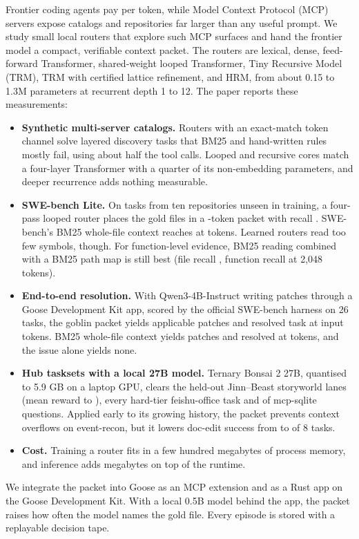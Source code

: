 Frontier coding agents pay per token, while Model Context Protocol (MCP) servers expose catalogs and repositories far
larger than any useful prompt. We study small local routers that explore such MCP surfaces and hand the frontier model
a compact, verifiable context packet. The routers are lexical, dense, feed-forward Transformer, shared-weight looped
Transformer, Tiny Recursive Model (TRM), TRM with certified lattice refinement, and HRM, from about 0.15 to 1.3M
parameters at recurrent depth 1 to 12. The paper reports these measurements:
\begin{itemize}
\item \textbf{Synthetic multi-server catalogs.} Routers with an exact-match token channel solve layered discovery tasks that BM25 and
hand-written rules mostly fail, using about half the tool calls. Looped and recursive cores match a four-layer
Transformer with a quarter of its non-embedding parameters, and deeper recurrence adds nothing measurable.
\item \textbf{SWE-bench Lite.} On \McpThreeInstances{} tasks from ten repositories unseen in training, a four-pass looped
router places the gold files in a \CompactFirstTokens{}-token packet with recall \CompactFirstFileRecall{}. SWE-bench's
BM25 whole-file context reaches \BmFilesRecallTwentySeven{} at \BmFilesTokensTwentySeven{} tokens. Learned routers
read too few symbols, though. For function-level evidence, BM25 reading combined with a BM25 path map is still best
(file recall \BmComposedFileRecallTwoK{}, function recall \BmComposedSymRecallTwoK{} at 2,048 tokens).
\item \textbf{End-to-end resolution.} With Qwen3-4B-Instruct writing patches through a Goose Development Kit app, scored by the
official SWE-bench harness on 26 tasks, the goblin packet yields \EtoeGoblinPatches{} applicable patches and
\EtoeGoblinResolved{} resolved task at \EtoeGoblinInput{} input tokens. BM25 whole-file context yields
\EtoeBmPatches{} patches and \EtoeBmResolved{} resolved at \EtoeBmInput{} tokens, and the issue alone yields none.
\item \textbf{Hub tasksets with a local 27B model.} Ternary Bonsai 2 27B, quantised to 5.9 GB on a laptop GPU, clears
the held-out Jinn--Beast storyworld lanes (mean reward \HubJbmCrossDevEightZeroMean{} to \HubJbmMeshTwoDevMean{}), every
hard-tier feishu-office task and \HubSqliteAllSolved{} of \HubSqliteAllN{} mcp-sqlite questions. Applied early to its
growing history, the packet prevents context overflows on event-recon, but it lowers doc-edit success from
\HubDoceditRawSolved{} to \HubDoceditGoblinSolved{} of 8 tasks.
\item \textbf{Cost.} Training a router fits in a few hundred megabytes of process memory, and inference adds megabytes on top of the
runtime.
\end{itemize}
We integrate the packet into Goose as an MCP extension and as a Rust app on the Goose Development Kit. With a local
0.5B model behind the app, the packet raises how often the model names the gold file. Every episode is stored with a
replayable decision tape.
